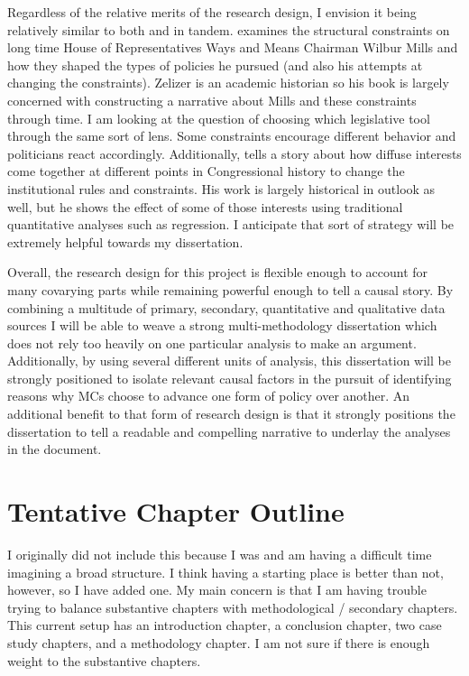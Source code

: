 \documentclass[12pt]{article}
\begin{document}
Regardless of the relative merits of the research design, I envision it being relatively similar to both \cite{zelizer1998} and \cite{schickler2001} in tandem. \cite{zelizer1998} examines the structural constraints on long time House of Representatives Ways and Means Chairman Wilbur Mills and how they shaped the types of policies he pursued (and also his attempts at changing the constraints). Zelizer is an academic historian so his book is largely concerned with constructing a narrative about Mills and these constraints through time. I am looking at the question of choosing which legislative tool through the same sort of lens. Some constraints encourage different behavior and politicians react accordingly. Additionally, \cite{schickler2001} tells a story about how diffuse interests come together at different points in Congressional history to change the institutional rules and constraints. His work is largely historical in outlook as well, but he shows the effect of some of those interests using traditional quantitative analyses such as regression. I anticipate that sort of strategy will be extremely helpful towards my dissertation.

Overall, the research design for this project is flexible enough to account for many covarying parts while remaining powerful enough to tell a causal story. By combining a multitude of primary, secondary, quantitative and qualitative data sources I will be able to weave a strong multi-methodology dissertation which does not rely too heavily on one particular analysis to make an argument. Additionally, by using several different units of analysis, this dissertation will be strongly positioned to isolate relevant causal factors in the pursuit of identifying reasons why MCs choose to advance one form of policy over another. An additional benefit to that form of research design is that it strongly positions the dissertation to tell a readable and compelling narrative to underlay the analyses in the document. 


\newpage
    {}


\newpage
\appendix
\section{Tentative Chapter Outline}
I originally did not include this because I was and am having a difficult time imagining a broad structure. I think having a starting place is better than not, however, so I have added one. My main concern is that I am having trouble trying to balance substantive chapters with methodological / secondary chapters. This current setup has an introduction chapter, a conclusion chapter, two case study chapters, and a methodology chapter. I am not sure if there is enough weight to the substantive chapters.
\end{document}
